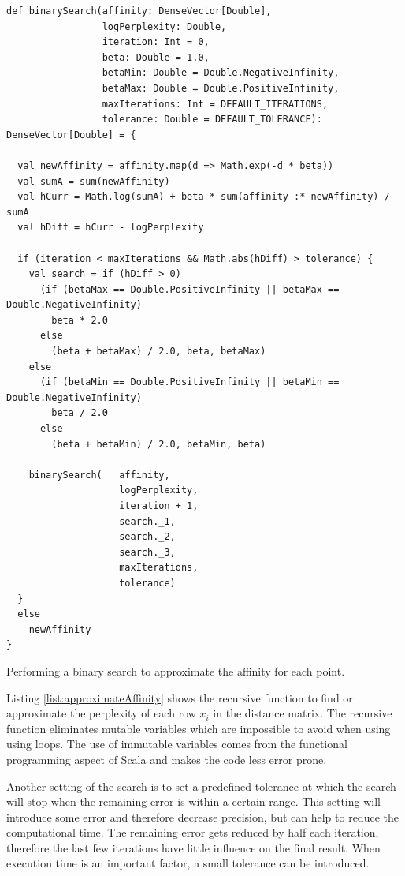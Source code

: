 \begin{listing}[ht!]
\begin{verbatim}
def binarySearch(affinity: DenseVector[Double],
                 logPerplexity: Double,
                 iteration: Int = 0,
                 beta: Double = 1.0,
                 betaMin: Double = Double.NegativeInfinity,
                 betaMax: Double = Double.PositiveInfinity,
                 maxIterations: Int = DEFAULT_ITERATIONS,
                 tolerance: Double = DEFAULT_TOLERANCE): DenseVector[Double] = {

  val newAffinity = affinity.map(d => Math.exp(-d * beta))
  val sumA = sum(newAffinity)
  val hCurr = Math.log(sumA) + beta * sum(affinity :* newAffinity) / sumA
  val hDiff = hCurr - logPerplexity

  if (iteration < maxIterations && Math.abs(hDiff) > tolerance) {
    val search = if (hDiff > 0)
      (if (betaMax == Double.PositiveInfinity || betaMax == Double.NegativeInfinity)
        beta * 2.0
      else
        (beta + betaMax) / 2.0, beta, betaMax)
    else
      (if (betaMin == Double.PositiveInfinity || betaMin == Double.NegativeInfinity)
        beta / 2.0
      else
        (beta + betaMin) / 2.0, betaMin, beta)

    binarySearch(   affinity,
                    logPerplexity, 
                    iteration + 1, 
                    search._1, 
                    search._2, 
                    search._3, 
                    maxIterations, 
                    tolerance)
  }
  else
    newAffinity
}
\end{verbatim}
\caption{Performing a binary search to approximate the affinity for each point.}
\label{list:approximateAffinity}
\end{listing}

Listing \ref{list:approximateAffinity} shows the recursive function to find or approximate the perplexity of each row $x_{i}$ in the distance matrix. The recursive function eliminates mutable variables which are impossible to avoid when using using loops. The use of immutable variables comes from the functional programming aspect of Scala and makes the code less error prone.

Another setting of the search is to set a predefined tolerance at which the search will stop when the remaining error is within a certain range. This setting will introduce some error and therefore decrease precision, but can help to reduce the computational time. The remaining error gets reduced by half each iteration, therefore the last few iterations have little influence on the final result. When execution time is an important factor, a small tolerance can be introduced.

